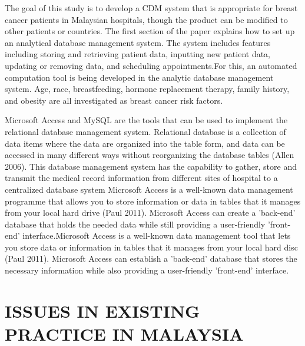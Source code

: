 \documentclass[10pt,a4paper,twoside]{article}
\begin{document}
The goal of this study is to develop a CDM system that is appropriate for breast cancer patients in Malaysian hospitals, though the product can be modified to other patients or countries. The first section of the paper explains how to set up an analytical database management system. The system includes features including storing and retrieving patient data, inputting new patient data, updating or removing data, and scheduling appointments.For this, an automated computation tool is being developed in the analytic database management system. Age, race, breastfeeding, hormone replacement therapy, family history, and obesity are all investigated as breast cancer risk factors.

\vspace{0.3cm}
Microsoft Access and MySQL are the tools that can be
used to implement the relational database management
system. Relational database is a collection of data items
where the data are organized into the table form, and
data can be accessed in many different ways without
reorganizing the database tables (Allen 2006). This
database management system has the capability to gather,
store and transmit the medical record information from
different sites of hospital to a centralized database system
Microsoft Access is a well-known data management programme that allows you to store information or data in tables that it manages from your local hard drive (Paul 2011).
Microsoft Access can create a 'back-end' database that holds the needed data while still providing a user-friendly 'front-end' interface.Microsoft Access is a well-known data management tool that lets you store data or information in tables that it manages from your local hard disc (Paul 2011).
Microsoft Access can establish a 'back-end' database that stores the necessary information while also providing a user-friendly 'front-end' interface.

\section{ISSUES IN EXISTING PRACTICE IN MALAYSIA}
\end{document}
